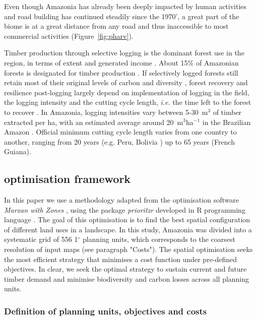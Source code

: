 \documentclass{article}
\begin{document}
Even though Amazonia has already been deeply impacted by human activities and road building has continued steadily since the 1970', a great part of the biome is at a great distance from any road and thus inaccessible to most commercial activities (Figure~\ref{fig:pharv}).

Timber production through selective logging is the dominant forest use in the region, in terms of extent and generated income \cite{Blaser2011}. About 15\% of Amazonian forests is designated for timber production \cite{FAO2011}. If selectively logged forests still retain most of their original levels of carbon and diversity \cite{Putz2012}, forest recovery and resilience post-logging largely depend on implementation of logging in the field, the logging intensity and the cutting cycle length, \textit{i.e.} the time left to the forest to recover \cite{Rutishauser2015,Piponiot2018}. In Amazonia, logging intensities vary between 5-30~m$^3$ of timber extracted per ha, with an estimated average around 20~m$^3$ha$^{-1}$ in the Brazilian Amazon \cite{Asner2005}. Official minimum cutting cycle length varies from one country to another, ranging from 20 years (e.g. Peru, Bolivia \cite{Fredericksen2003,Blaser2011}) up to 65 years (French Guiana). 

\subsection{optimisation framework}

In this paper we use a methodology adapted from the optimisation software \textit{Marxan with Zones} \cite{Watts2009}, using the package \textit{prioritzr} \cite{Hanson2018} developed in R programming language \cite{RCoreTeam2017}. 
The goal of this optimisation is to find the best spatial configuration of different land uses in a landscape. In this study, Amazonia was divided into a systematic grid of 556 1$^{\circ}$ planning units, which corresponds to the coarsest resolution of input maps (see paragraph "Costs"). The spatial optimisation seeks the most efficient strategy that minimises a cost function under pre-defined objectives. In clear, we seek the optimal strategy to sustain current and future timber demand and minimise biodiversity and carbon losses across all planning units.

\subsubsection{Definition of planning units, objectives and costs }
\label{sec:defPU}
\end{document}

